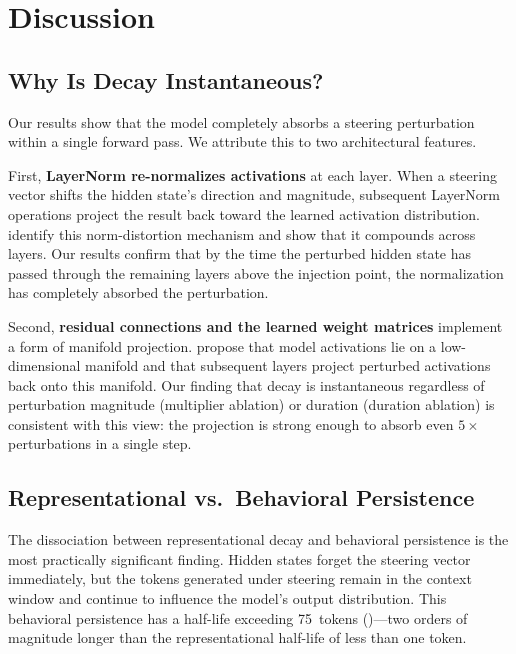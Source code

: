 \section{Discussion}
\label{sec:discussion}

\subsection{Why Is Decay Instantaneous?}

Our results show that the model completely absorbs a steering perturbation within
a single forward pass. We attribute this to two architectural features.

First, \textbf{LayerNorm re-normalizes activations} at each layer. When a
steering vector shifts the hidden state's direction and magnitude, subsequent
LayerNorm operations project the result back toward the learned activation
distribution. \citet{dang2026selective} identify this norm-distortion mechanism
and show that it compounds across layers. Our results confirm that by the time
the perturbed hidden state has passed through the remaining layers above the
injection point, the normalization has completely absorbed the perturbation.

Second, \textbf{residual connections and the learned weight matrices} implement
a form of manifold projection. \citet{xu2026why} propose that model activations
lie on a low-dimensional manifold and that subsequent layers project perturbed
activations back onto this manifold. Our finding that decay is instantaneous
regardless of perturbation magnitude (multiplier ablation) or duration (duration
ablation) is consistent with this view: the projection is strong enough to
absorb even $5\times$ perturbations in a single step.

\subsection{Representational vs.\ Behavioral Persistence}

The dissociation between representational decay and behavioral persistence is
the most practically significant finding. Hidden states forget the steering
vector immediately, but the tokens generated under steering remain in the
context window and continue to influence the model's output distribution. This
behavioral persistence has a half-life exceeding 75~tokens ()---two orders of
magnitude longer than the representational half-life of less than one token.

